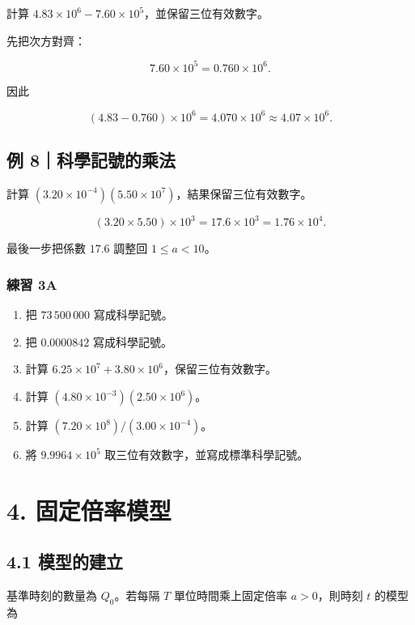 \documentclass[11pt,a4paper]{article}
\providecommand{\tightlist}{%
  \setlength{\itemsep}{0pt}\setlength{\parskip}{0pt}}
\begin{document}
計算 \(4.83\times10^6-7.60\times10^5\)，並保留三位有效數字。

先把次方對齊：

\[
7.60\times10^5=0.760\times10^6.
\]

因此

\[
(4.83-0.760)\times10^6
=4.070\times10^6
\approx\boxed{4.07\times10^6}.
\]

\subsection{例 8｜科學記號的乘法}\label{ux4f8b-8ux79d1ux5b78ux8a18ux865fux7684ux4e58ux6cd5}

計算 \((3.20\times10^{-4})(5.50\times10^7)\)，結果保留三位有效數字。

\[
(3.20\times5.50)\times10^3
=17.6\times10^3
=\boxed{1.76\times10^4}.
\]

最後一步把係數 \(17.6\) 調整回 \(1\le a<10\)。

\subsubsection{練習 3A}\label{ux7df4ux7fd2-3a}

\begin{enumerate}
\def\labelenumi{\arabic{enumi}.}
\tightlist
\item
  把 \(73\,500\,000\) 寫成科學記號。
\item
  把 \(0.0000842\) 寫成科學記號。
\item
  計算 \(6.25\times10^7+3.80\times10^6\)，保留三位有效數字。
\item
  計算 \((4.80\times10^{-3})(2.50\times10^6)\)。
\item
  計算 \((7.20\times10^8)/(3.00\times10^{-4})\)。
\item
  將 \(9.9964\times10^5\) 取三位有效數字，並寫成標準科學記號。
\end{enumerate}

\section{4. 固定倍率模型}\label{ux56faux5b9aux500dux7387ux6a21ux578b}

\subsection{4.1 模型的建立}\label{ux6a21ux578bux7684ux5efaux7acb}

基準時刻的數量為 \(Q_0\)。若每隔 \(T\) 單位時間乘上固定倍率 \(a>0\)，則時刻 \(t\) 的模型為
\end{document}
